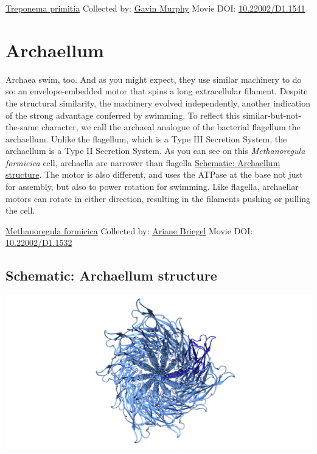 \documentclass[]{tufte-book}
\begin{document}
\hypertarget{htmlwidget-358a9d4259163c0a554b}{}

\label{fig:6-7a}\protect\hyperlink{tree}{Treponema primitia} Collected by: \protect\hyperlink{gavin_murphy}{Gavin Murphy} Movie DOI: \href{https://doi.org/10.22002/D1.1541}{10.22002/D1.1541}

\hypertarget{archaellum}{%
\section{Archaellum}\label{archaellum}}

Archaea swim, too. And as you might expect, they use similar machinery to do so: an envelope-embedded motor that spins a long extracellular filament. Despite the structural similarity, the machinery evolved independently, another indication of the strong advantage conferred by swimming. To reflect this similar-but-not-the-same character, we call the archaeal analogue of the bacterial flagellum the archaellum. Unlike the flagellum, which is a Type III Secretion System, the archaellum is a Type II Secretion System. As you can see on this \emph{Methanoregula formicica} cell, archaella are narrower than flagella \protect\hyperlink{Archaellum_structure}{Schematic: Archaellum structure}. The motor is also different, and uses the ATPase at the base not just for assembly, but also to power rotation for swimming. Like flagella, archaellar motors can rotate in either direction, resulting in the filaments pushing or pulling the cell.



\hypertarget{htmlwidget-b4f3a5a7a6d0029586e8}{}

\label{fig:6-8}\protect\hyperlink{tree}{Methanoregula formicica} Collected by: \protect\hyperlink{ariane_briegel}{Ariane Briegel} Movie DOI: \href{https://doi.org/10.22002/D1.1532}{10.22002/D1.1532}

\hypertarget{Archaellum_structure}{%
\subsection*{Schematic: Archaellum structure}\label{Archaellum_structure}}

\includegraphics{img/schematics/6_8_1}
\end{document}
